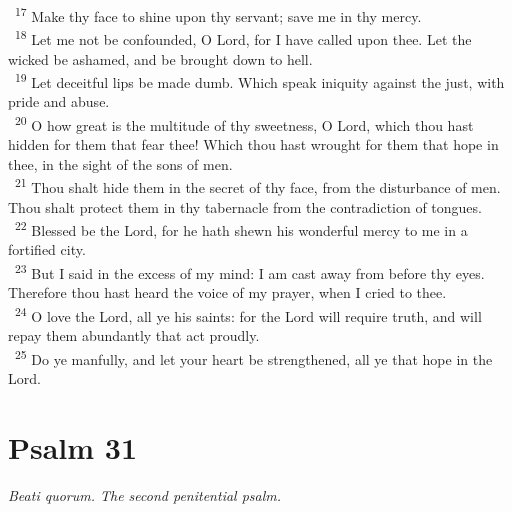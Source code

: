 \documentclass[a5paper,12pt]{article}
\begin{document}
\begin{multicols*}{2}
~\textsuperscript{17} Make thy face to shine upon thy servant; save me in thy mercy.\\
~\textsuperscript{18} Let me not be confounded, O Lord, for I have called upon thee. Let the wicked be ashamed, and be brought down to hell.\\
~\textsuperscript{19} Let deceitful lips be made dumb. Which speak iniquity against the just, with pride and abuse.\\
~\textsuperscript{20} O how great is the multitude of thy sweetness, O Lord, which thou hast hidden for them that fear thee! Which thou hast wrought for them that hope in thee, in the sight of the sons of men.\\
~\textsuperscript{21} Thou shalt hide them in the secret of thy face, from the disturbance of men. Thou shalt protect them in thy tabernacle from the contradiction of tongues.\\
~\textsuperscript{22} Blessed be the Lord, for he hath shewn his wonderful mercy to me in a fortified city.\\
~\textsuperscript{23} But I said in the excess of my mind: I am cast away from before thy eyes. Therefore thou hast heard the voice of my prayer, when I cried to thee.\\
~\textsuperscript{24} O love the Lord, all ye his saints: for the Lord will require truth, and will repay them abundantly that act proudly.\\
~\textsuperscript{25} Do ye manfully, and let your heart be strengthened, all ye that hope in the Lord.\\

\section{Psalm 31}
\label{sec:org7f40693}
\emph{Beati quorum. The second penitential psalm.}\\


\end{multicols*}
\end{document}
